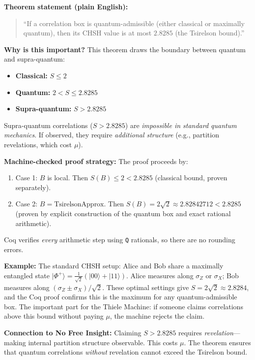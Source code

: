 \textbf{Theorem statement (plain English):}
\begin{quote}
``If a correlation box is quantum-admissible (either classical or maximally quantum), then its CHSH value is at most $2.8285$ (the Tsirelson bound).''
\end{quote}

\textbf{Why is this important?} This theorem draws the boundary between quantum and supra-quantum:
\begin{itemize}
    \item \textbf{Classical:} $S \leq 2$
    \item \textbf{Quantum:} $2 < S \leq 2.8285$
    \item \textbf{Supra-quantum:} $S > 2.8285$
\end{itemize}
Supra-quantum correlations ($S > 2.8285$) are \textit{impossible in standard quantum mechanics}. If observed, they require \textit{additional structure} (e.g., partition revelations, which cost $\mu$).

\textbf{Machine-checked proof strategy:} The proof proceeds by:
\begin{enumerate}
    \item Case 1: $B$ is local. Then $S(B) \leq 2 < 2.8285$ (classical bound, proven separately).
    \item Case 2: $B = \text{TsirelsonApprox}$. Then $S(B) = 2\sqrt{2} \approx 2.82842712 < 2.8285$ (proven by explicit construction of the quantum box and exact rational arithmetic).
\end{enumerate}
Coq verifies \textit{every} arithmetic step using \texttt{Q} rationals, so there are no rounding errors.

\textbf{Example:} The standard CHSH setup: Alice and Bob share a maximally entangled state $|\Phi^+\rangle = \frac{1}{\sqrt{2}}(|00\rangle + |11\rangle)$. Alice measures along $\sigma_Z$ or $\sigma_X$; Bob measures along $(\sigma_Z \pm \sigma_X)/\sqrt{2}$. These optimal settings give $S = 2\sqrt{2} \approx 2.8284$, and the Coq proof confirms this is the maximum for any quantum-admissible box. The important part for the Thiele Machine: if someone claims correlations above this bound without paying $\mu$, the machine rejects the claim.

\textbf{Connection to No Free Insight:} Claiming $S > 2.8285$ requires \textit{revelation}---making internal partition structure observable. This costs $\mu$. The theorem ensures that quantum correlations \textit{without} revelation cannot exceed the Tsirelson bound.


